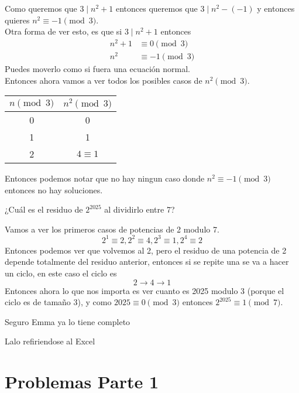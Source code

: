 \documentclass[11pt]{scrartcl}
\begin{document}
\begin{soln}
Como queremos que $3 \mid n^2+1$ entonces queremos que $3 \mid n^2-(-1)$ y entonces quieres $n^2 \equiv -1 \pmod 3$.  \\
Otra forma de ver esto, es que si $3 \mid n^2+1$ entonces
\begin{align*}
n^2+1 &\equiv 0 \pmod 3 \\
n^2 &\equiv -1 \pmod 3
\end{align*}
Puedes moverlo como si fuera una ecuaci\'on normal. \\

Entonces ahora vamos a ver todos los posibles casos de $n^2 \pmod 3$. 
\begin{center}
\begin{tabular}{|c|c|}
\hline
$n \pmod 3$ &  $n^2\pmod 3$\\
\hline
0 &  0 \\
\hline
1 &  1\\
\hline
2 &  $ 4 \equiv 1 $\\
\hline
\end{tabular}
\end{center}

Entonces podemos notar que no hay ningun caso donde $n^2 \equiv -1 \pmod 3$ entonces no hay soluciones. \\
\end{soln}
\begin{example}
¿Cu\'al es el residuo de $2^{2025}$ al dividirlo entre 7?
\end{example}

\begin{soln}
Vamos a ver los primeros casos de potencias de 2 modulo 7. \\
\[2^1 \equiv 2, 2^2 \equiv 4, 2^3 \equiv 1, 2^4 \equiv 2\]
Entonces podemos ver que volvemos al 2, pero el residuo de una potencia de 2 depende totalmente del residuo anterior, entonces si se repite una se va a hacer un ciclo, en este caso el ciclo es
\[2 \rightarrow 4 \rightarrow 1 \]
Entonces ahora lo que nos importa es ver cuanto es 2025 modulo 3 (porque el ciclo es de tamaño 3), y como $2025 \equiv 0 \pmod 3$ entonces $2^{2025} \equiv 1 \pmod 7$.
\end{soln}






\newpage
\epigraph{Seguro Emma ya lo tiene completo
}{Lalo refiriendose al Excel}

\section{Problemas Parte 1	}
\end{document}
